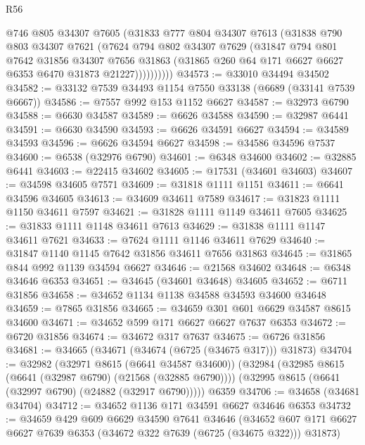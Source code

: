 \begin{lexlean}{R56}
\begin{coremodule}
              @746
              @805
              @34307
              @7605
              (@31833
                @777
                @804
                @34307
                @7613
                (@31838
                  @790
                  @803
                  @34307
                  @7621
                  (@7624
                    @794
                    @802
                    @34307
                    @7629
                    (@31847
                      @794
                      @801
                      @7642
                      @31856
                      @34307
                      @7656
                      @31863
                      (@31865 @260 @64 @171 @6627 @6627 @6353 @6470 @31873 @21227))))))))))
@34573 := @33010 @34494 @34502
@34582 := @33132 @7539 @34493 @1154 @7550 @33138 (@6689 (@33141 @7539 @6667))
@34586 := @7557 @992 @153 @1152 @6627
@34587 := @32973 @6790
@34588 := @6630 @34587
@34589 := @6626 @34588
@34590 := @32987 @6441
@34591 := @6630 @34590
@34593 := @6626 @34591 @6627
@34594 := @34589 @34593
@34596 := @6626 @34594 @6627
@34598 := @34586 @34596 @7537
@34600 := @6538 (@32976 @6790)
@34601 := @6348 @34600
@34602 := @32885 @6441
@34603 := @22415 @34602
@34605 := @17531 (@34601 @34603)
@34607 := @34598 @34605 @7571
@34609 := @31818 @1111 @1151
@34611 := @6641 @34596 @34605
@34613 := @34609 @34611 @7589
@34617 := @31823 @1111 @1150 @34611 @7597
@34621 := @31828 @1111 @1149 @34611 @7605
@34625 := @31833 @1111 @1148 @34611 @7613
@34629 := @31838 @1111 @1147 @34611 @7621
@34633 := @7624 @1111 @1146 @34611 @7629
@34640 := @31847 @1140 @1145 @7642 @31856 @34611 @7656 @31863
@34645 := @31865 @844 @992 @1139 @34594 @6627
@34646 := @21568 @34602
@34648 := @6348 @34646 @6353
@34651 := @34645 (@34601 @34648) @34605
@34652 := @6711 @31856
@34658 := @34652 @1134 @1138 @34588 @34593 @34600 @34648
@34659 := @7865 @31856
@34665 := @34659 @301 @601 @6629 @34587 @8615 @34600
@34671 := @34652 @599 @171 @6627 @6627 @7637 @6353
@34672 := @6720 @31856
@34674 := @34672 @317 @7637
@34675 := @6726 @31856
@34681 := @34665 (@34671 (@34674 (@6725 (@34675 @317))) @31873)
@34704 := @32982
    (@32971 @8615 (@6641 @34587 @34600))
    (@32984
      (@32985 @8615 (@6641 (@32987 @6790) (@21568 (@32885 @6790))))
      (@32995 @8615 (@6641 (@32997 @6790) (@24882 (@32917 @6790)))))
    @6359
@34706 := @34658 (@34681 @34704)
@34712 := @34652 @1136 @171 @34591 @6627 @34646 @6353
@34732 := @34659
    @429
    @609
    @6629
    @34590
    @7641
    @34646
    (@34652 @607 @171 @6627 @6627 @7639 @6353 (@34672 @322 @7639 (@6725 (@34675 @322))) @31873)

\end{coremodule}
\end{lexlean}
